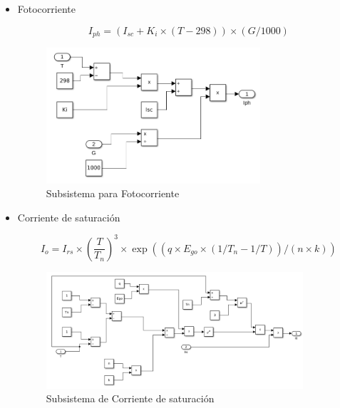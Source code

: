 \documentclass[a4paper,12pt]{article}
\begin{document}
	\begin{itemize}
		\item Fotocorriente
		
	
		
			\begin{equation*}
				I_{ph} = \left(I_{sc} + K_i \times \left(T - 298 \right) \right) \times \left(G/1000 \right)
			\end{equation*}
			
			\begin{figure}[h!]
				\centering
				\includegraphics[width=0.75\textwidth]{./imagenes/simulink3.png}
				\caption{Subsistema para Fotocorriente}
			\end{figure} 
		
		\item Corriente de saturación
		
			\begin{equation*}
				I_o = I_{rs} \times \left( \frac{T}{T_n} \right)^3 \times \exp \left( \left( q \times E_{go} \times \left(1/T_n - 1/T \right) \right)/ \left(n \times k \right) \right)
			\end{equation*}
			
			\begin{figure}[htb]
				\centering
				\includegraphics[width=0.9\textwidth]{./imagenes/simulink4.png}
				\caption{Subsistema de Corriente de saturación}
			\end{figure}
		

\end{itemize}
\end{document}

